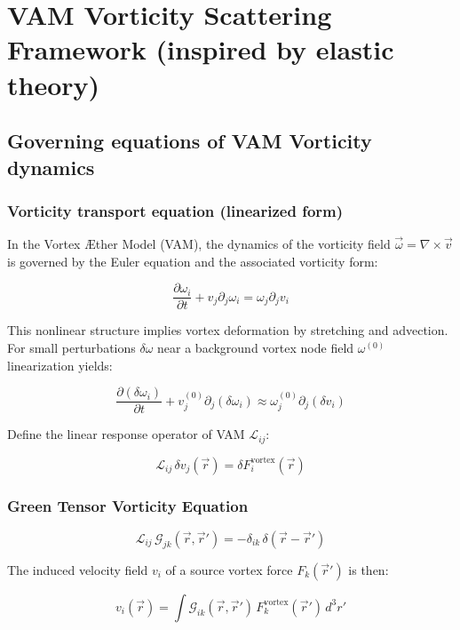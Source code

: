 \section{VAM Vorticity Scattering Framework (inspired by elastic theory)}

\subsection{Governing equations of VAM Vorticity dynamics}

\subsubsection*{Vorticity transport equation (linearized form)}

In the Vortex Æther Model (VAM), the dynamics of the vorticity field \(\vec{\omega} = \nabla \times \vec{v}\) is governed by the Euler equation and the associated vorticity form:

\[
    \frac{\partial \omega_i}{\partial t} + v_j \partial_j \omega_i = \omega_j \partial_j v_i
\]

This nonlinear structure implies vortex deformation by stretching and advection. For small perturbations \(\delta\omega\) near a background vortex node field \(\omega^{(0)}\) linearization yields:

\[
    \frac{\partial (\delta \omega_i)}{\partial t} + v_j^{(0)} \partial_j (\delta \omega_i) \approx \omega_j^{(0)} \partial_j (\delta v_i)
\]

Define the linear response operator of VAM \(\mathcal{L}_{ij}\):

\[
    \mathcal{L}_{ij} \, \delta v_j(\vec{r}) = \delta F_i^{\text{vortex}}(\vec{r})
\]

\subsubsection*{Green Tensor Vorticity Equation}

\[
    \mathcal{L}_{ij} \, \mathcal{G}_{jk}(\vec{r}, \vec{r}') = -\delta_{ik} \, \delta(\vec{r} - \vec{r}')
\]

The induced velocity field \(v_i\) of a source vortex force \(F_k(\vec{r}')\) is then:

\[
    v_i(\vec{r}) = \int \mathcal{G}_{ik}(\vec{r}, \vec{r}') \, F_k^{\text{vortex}}(\vec{r}') \, d^3 r'
\]

